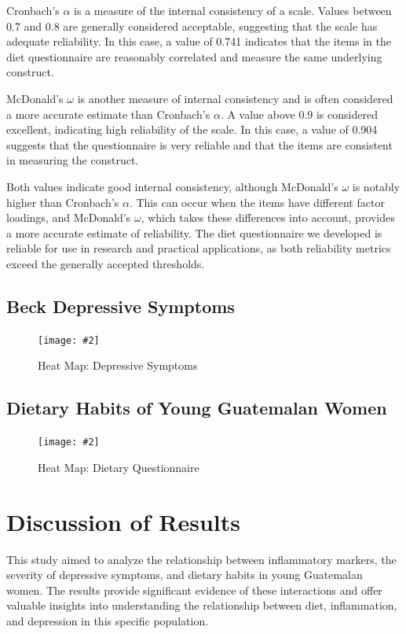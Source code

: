 \documentclass[jou]{apa7}
\newcommand{\includegraphicsmax}[2][]{%
	\texttt{[image: \#2]}%
}
\begin{document}
Cronbach's $\alpha$ is a measure of the internal consistency of a scale. Values between 0.7 and 0.8 are generally considered acceptable, suggesting that the scale has adequate reliability. In this case, a value of 0.741 indicates that the items in the diet questionnaire are reasonably correlated and measure the same underlying construct.

McDonald's $\omega$ is another measure of internal consistency and is often considered a more accurate estimate than Cronbach's $\alpha$. A value above 0.9 is considered excellent, indicating high reliability of the scale. In this case, a value of 0.904 suggests that the questionnaire is very reliable and that the items are consistent in measuring the construct.

Both values indicate good internal consistency, although McDonald's $\omega$ is notably higher than Cronbach's $\alpha$. This can occur when the items have different factor loadings, and McDonald's $\omega$, which takes these differences into account, provides a more accurate estimate of reliability. The diet questionnaire we developed is reliable for use in research and practical applications, as both reliability metrics exceed the generally accepted thresholds.

\subsection{Beck Depressive Symptoms}
\begin{figure}[H]
	\centering
	\includegraphicsmax{sintomasDepresivosBeckGraph.pdf}
	\caption{Heat Map: Depressive Symptoms}
	\label{fig:Figure2}
\end{figure}
\vspace{-1em} %

\subsection{Dietary Habits of Young Guatemalan Women}
\begin{figure}[H]
	\centering
	\includegraphicsmax{dietGraph.pdf}
	\caption{Heat Map: Dietary Questionnaire}
	\label{fig:Figure3}
\end{figure}
\section{Discussion of Results}\label{discusiuxf3n-de-resultados}

This study aimed to analyze the relationship between inflammatory markers, the severity of depressive symptoms, and dietary habits in young Guatemalan women. The results provide significant evidence of these interactions and offer valuable insights into understanding the relationship between diet, inflammation, and depression in this specific population.
\end{document}
